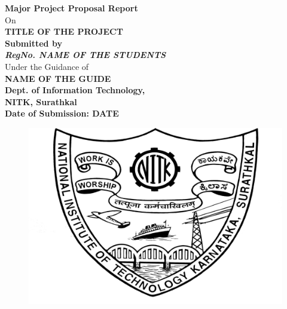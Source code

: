 \documentclass{article}[12pt,a4paper]
\begin{document}
\begin{titlepage}

    \centering
    \vspace{-3em}
    {\Large\textbf{Major Project Proposal Report}}\\
    \vspace{1.5em}
    On\\
    \vspace{1.5em}
    {\Huge \textbf{TITLE OF THE PROJECT}}\\
    \vspace{3em}
    {\LARGE \bfseries Submitted by}\\
    \vspace{2em}
    {\Large \emph{\textbf{RegNo.  NAME OF THE STUDENTS}}}\\
    \vspace{4em}
    {\Large Under the Guidance of}\\
    \vspace{2em}
    {\Large \textbf{NAME OF THE GUIDE}}\\
    \vspace{2em}
    {\Large \textbf{Dept. of Information Technology,}}\\
    \vspace{2em}
    {\Large \textbf{NITK, Surathkal}}\\
    \vspace{4em}
    {\Large \textbf{Date of Submission: DATE}}\\
    \vspace{1.5em}
    \begin{figure}[!ht]
        \centering
        \includegraphics{nitk-logo.png}

\end{figure}
\end{titlepage}
\end{document}
